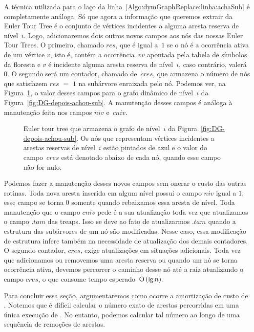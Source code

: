 A técnica utilizada para o laço da linha~\ref{Algo:dymGraphReplace:linha:achaSub} é completamente análoga. Só que agora a informação que queremos extrair da Euler Tour Tree é o conjunto de vértices incidentes a alguma aresta reserva de nível~$i$. Logo, adicionaremos dois outros novos campos aos nós das nossas Euler Tour Trees. O primeiro, chamado $res$, que é igual a~$1$ se o nó é a ocorrência ativa de um vértice $v$, isto é, contém a ocorrência~$vv$ apontada pela tabela de símbolos da floresta e $v$ é incidente alguma aresta reserva de nível~$i$, caso contrário, valerá~$0$. O segundo será um contador, chamado de~$cres$, que armazena o número de nós que satisfazem $res$ $=$ $1$ na subárvore enraizada pelo nó. Podemos ver, na Figura~\ref{fig:DG-TREAP-res}, o valor desses campos para o grafo dinâmico de nível~$i$ da Figura~\ref{fig:DG-depois-achou-sub}. A manutenção desses campos é análoga à manutenção feita nos campos $niv$ e~$cniv$.

\begin{figure}[htb]
\scalebox{.61}{
\centering
}
\caption{Euler tour tree que armazena o grafo de nível~$i$ da Figura~\ref{fig:DG-depois-achou-sub}. Os nós que representam vértices incidentes a arestas reservas de nível~$i$ estão pintados de azul e o valor do campo~$cres$ está denotado abaixo de cada nó, quando esse campo não for nulo.}
\label{fig:DG-TREAP-res}
\end{figure}

Podemos fazer a manutenção desses novos campos sem onerar o custo das outras rotinas. Toda nova aresta inserida em algum nível possui o campo $niv$ igual a $1$, esse campo se torna $0$ somente quando rebaixamos essa aresta de nível. Toda manutenção que o campo $cniv$ pede é a sua atualização toda vez que atualizamos o campo $.tam$ das treaps. Isso se deve ao fato de atualizarmos $.tam$ quando a estrutura das subárvores de um nó são modificadas. Nesse caso, essa modificação de estrutura infere também na necessidade de atualização dos demais contadores. O segundo contador, $cres$, exige atualizações em situações adicionais. Toda vez que adicionamos ou removemos uma aresta reserva ou quando um nó se torna ocorrência ativa, devemos percorrer o caminho desse nó até a raiz atualizando o campo $cres$, o que consome tempo esperado~$\text{O}\left(\lg n\right)$.


Para concluir essa seção, argumentaremos como ocorre a amortização de custo de \dymGraphDelEdge{}. Notemos que é difícil calcular o número exato de arestas percorridas em uma única execução de \dymGraphReplace{}. No entanto, podemos calcular tal número ao longo de uma sequência de remoções de arestas. 






